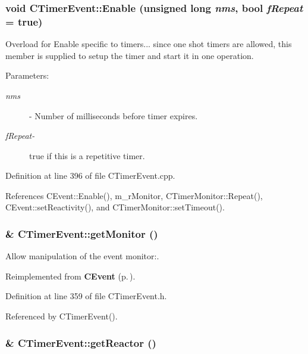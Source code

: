 \subsubsection{\setlength{\rightskip}{0pt plus 5cm}void CTimer\-Event::Enable (unsigned long {\em nms}, bool {\em f\-Repeat} = true)}\label{classCTimerEvent_a6}


Overload for Enable specific to timers... since one shot timers are allowed, this member is supplied to setup the timer and start it in one operation.\begin{Desc}
\item[Parameters: ]\par
\begin{description}
\item[{\em 
nms}]- Number of milliseconds before timer expires. \item[{\em 
f\-Repeat-}]true if this is a repetitive timer. \end{description}
\end{Desc}


Definition at line 396 of file CTimer\-Event.cpp.

References CEvent::Enable(), m\_\-r\-Monitor, CTimer\-Monitor::Repeat(), CEvent::set\-Reactivity(), and CTimer\-Monitor::set\-Timeout().
\subsubsection{\& CTimer\-Event::get\-Monitor ()\hspace{0.3cm}{\tt  [inline]}}\label{classCTimerEvent_a4}


Allow manipulation of the event monitor:.



Reimplemented from {\bf CEvent} {\rm (p.\,\pageref{classCEvent_a8})}.

Definition at line 359 of file CTimer\-Event.h.

Referenced by CTimer\-Event().
\subsubsection{\& CTimer\-Event::get\-Reactor ()\hspace{0.3cm}{\tt  [inline]}}\label{classCTimerEvent_a5}


